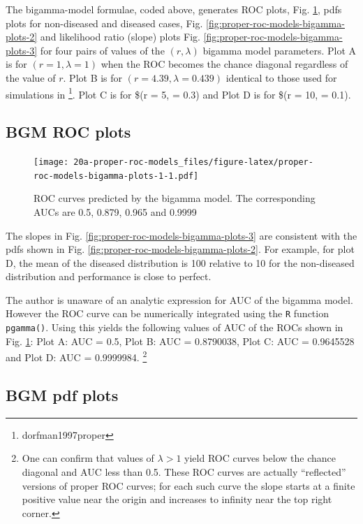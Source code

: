 \documentclass[
]{book}
\begin{document}
The bigamma-model formulae, coded above, generates ROC plots, Fig. \ref{fig:proper-roc-models-bigamma-plots-1}, pdfs plots for non-diseased and diseased cases, Fig. \ref{fig:proper-roc-models-bigamma-plots-2} and likelihood ratio (slope) plots Fig. \ref{fig:proper-roc-models-bigamma-plots-3} for four pairs of values of the \((r, \lambda)\) bigamma model parameters. Plot A is for \((r = 1, \lambda = 1)\) when the ROC becomes the chance diagonal regardless of the value of \(r\). Plot B is for \((r = 4.39, \lambda = 0.439)\) identical to those used for simulations in \footnote{dorfman1997proper}. Plot C is for \$(r = 5, \lambda = 0.3) and Plot D is for \$(r = 10, \lambda = 0.1).

\hypertarget{proper-roc-models-bigamma-rocs}{%
\subsection{BGM ROC plots}\label{proper-roc-models-bigamma-rocs}}

\begin{figure}
\centering
\texttt{[image: 20a-proper-roc-models\_files/figure-latex/proper-roc-models-bigamma-plots-1-1.pdf]}
\caption{\label{fig:proper-roc-models-bigamma-plots-1}ROC curves predicted by the bigamma model. The corresponding AUCs are 0.5, 0.879, 0.965 and 0.9999}
\end{figure}

The slopes in Fig. \ref{fig:proper-roc-models-bigamma-plots-3} are consistent with the pdfs shown in Fig. \ref{fig:proper-roc-models-bigamma-plots-2}. For example, for plot D, the mean of the diseased distribution is 100 relative to 10 for the non-diseased distribution and performance is close to perfect.

The author is unaware of an analytic expression for AUC of the bigamma model. However the ROC curve can be numerically integrated using the \texttt{R} function \texttt{pgamma()}. Using this yields the following values of AUC of the ROCs shown in Fig. \ref{fig:proper-roc-models-bigamma-plots-1}: Plot A: AUC = 0.5, Plot B: AUC = 0.8790038, Plot C: AUC = 0.9645528 and Plot D: AUC = 0.9999984. \footnote{One can confirm that values of \(\lambda > 1\) yield ROC curves below the chance diagonal and AUC less than 0.5. These ROC curves are actually ``reflected'' versions of proper ROC curves; for each such curve the slope starts at a finite positive value near the origin and increases to infinity near the top right corner.}

\hypertarget{proper-roc-models-bigamma-pdfs}{%
\subsection{BGM pdf plots}\label{proper-roc-models-bigamma-pdfs}}
\end{document}
